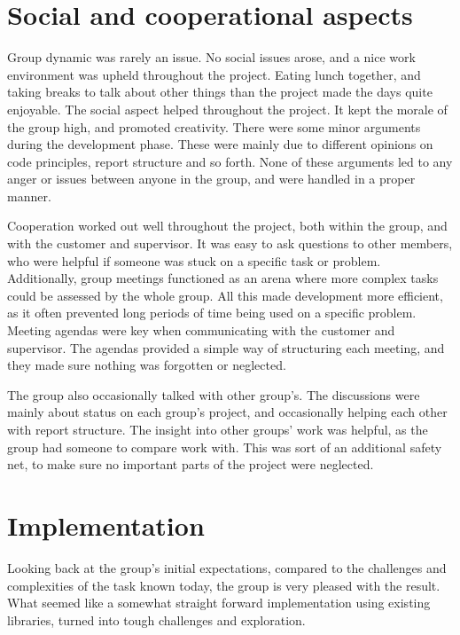 \section{Social and cooperational aspects}
\label{sec:Social_and_cooperation_aspects}

Group dynamic was rarely an issue. No social issues arose, and a nice work environment was upheld throughout the project. Eating lunch together, and taking breaks to talk about other things than the project made the days quite enjoyable. The social aspect helped throughout the project. It kept the morale of the group high, and promoted creativity. There were some minor arguments during the development phase. These were mainly due to different opinions on code principles, report structure and so forth. None of these arguments led to any anger or issues between anyone in the group, and were handled in a proper manner.

Cooperation worked out well throughout the project, both within the group, and with the customer and supervisor. It was easy to ask questions to other members, who were helpful if someone was stuck on a specific task or problem. Additionally, group meetings functioned as an arena where more complex tasks could be assessed by the whole group. All this made development more efficient, as it often prevented long periods of time being used on a specific problem. Meeting agendas were key when communicating with the customer and supervisor. The agendas provided a simple way of structuring each meeting, and they made sure nothing was forgotten or neglected.

The group also occasionally talked with other group's. The discussions were mainly about status on each group's project, and occasionally helping each other with report structure. The insight into other groups' work was helpful, as the group had someone to compare work with. This was sort of an additional safety net, to make sure no important parts of the project were neglected.

\section{Implementation}
\label{sec:Implementation}

Looking back at the group's initial expectations, compared to the challenges and complexities of the task known today, the group is very pleased with the result. What seemed like a somewhat straight forward implementation using existing libraries, turned into tough challenges and exploration.

